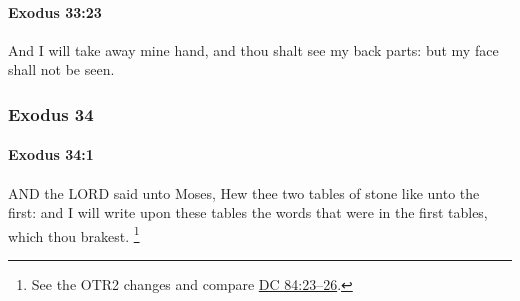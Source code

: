 		\paragraph{Exodus 33:23} %
			\label{EXODUS-33-23}

			And I will take away mine hand, and thou shalt see my back parts: but my face shall not be seen.

	\subsubsection{Exodus 34} %
		\label{EXODUS-34}

		\paragraph{Exodus 34:1} %
			\label{EXODUS-34-1}

			AND the LORD said unto Moses, Hew thee two tables of stone like unto the first: and I will write upon these tables the words that were in the first tables, which thou brakest.%
				\footnote{%
					See the OTR2 changes and compare \hyperref[DC84-23]{DC 84:23--26}.
					}

